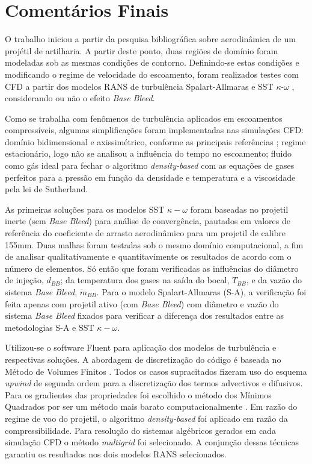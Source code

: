 \chapter{Comentários Finais}\label{cap:conclusoes}

O trabalho iniciou a partir da pesquisa bibliográfica sobre aerodinâmica de um projétil de artilharia. A partir deste ponto, duas regiões de domínio foram modeladas sob as mesmas condições de contorno. Definindo-se estas condições e modificando o regime de velocidade do escoamento, foram realizados testes com CFD a partir dos modelos RANS de turbulência Spalart-Allmaras \cite{Spalart1992} e SST $\kappa$-$\omega$ \cite{Menter1994TwoequationET,Menter2003,Menter2009}, considerando ou não o efeito \textit{Base Bleed}.

Como se trabalha com fenômenos de turbulência aplicados em escoamentos compressíveis, algumas simplificações foram implementadas nas simulações CFD: domínio bidimensional e axissimétrico, conforme as principais referências \cite{Mahmoud2009,Lucena2020}; regime estacionário, logo não se analisou a influência do tempo no escoamento; fluido como gás ideal para fechar o algoritmo \textit{density-based} com as equações de gases perfeitos para a pressão em função da densidade e temperatura e a viscosidade pela lei de Sutherland.

As primeiras soluções para os modelos SST $\kappa-\omega$ foram baseadas no projetil inerte (sem \textit{Base Bleed}) para análise de convergência, pautados em valores de referência \cite{Mahmoud2009} do coeficiente de arrasto aerodinâmico para um projetil de calibre 155mm. Duas malhas foram testadas sob o mesmo domínio computacional, a fim de analisar qualitativamente e quantitavimente os resultados de acordo com o número de elementos. Só então que foram verificadas as influências do diâmetro de injeção, $d_{BB}$; da temperatura dos gases na saída do bocal, $T_{BB}$, e da vazão do sistema \textit{Base Bleed}, $\Dot{m}_{BB}$. Para o modelo Spalart-Allmaras (S-A), a verificação foi feita apenas com projetil ativo (com \textit{Base Bleed}) com diâmetro e vazão do sistema \textit{Base Bleed} fixados para verificar a diferença dos resultados entre as metodologias S-A e SST $\kappa-\omega$.

Utilizou-se o software Fluent \cite{fluent2021ansys} para aplicação dos modelos de turbulência e respectivas soluções. A abordagem de discretização do código é baseada no Método de Volumes Finitos \cite{McDonald1971,MacComarck&Paulay1972}. Todos os casos supracitados fizeram uso do esquema \textit{upwind} de segunda ordem para a discretização dos termos advectivos e difusivos. Para os gradientes das propriedades foi escolhido o método dos Mínimos Quadrados por ser um método mais barato computacionalmente \cite{fluent2021ansys}. Em razão do regime de voo do projetil, o algoritmo \textit{density-based} \cite{Weiss1995PreconditioningAT,Weiss1997IMPLICITSO,Weiss1999ImplicitSO} foi aplicado em razão da compressibilidade. Para resolução do sistemas algébricos gerados em cada simulação CFD o método \textit{multigrid} \cite{Hutchinson1986} foi selecionado. A conjunção dessas técnicas garantiu os resultados nos dois modelos RANS selecionados.

